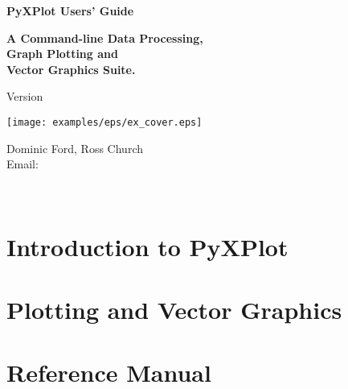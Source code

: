 \documentclass[a4paper,onecolumn,11pt]{book}
\begin{document}
\begin{titlepage}
\normalsize
\vspace*{0.5cm}
\begin{center}
{\Huge \bf PyXPlot Users' Guide}\\
\end{center}
\vspace*{0.5cm}
\begin{center}
{\LARGE \bf A Command-line Data Processing, \\ \vspace{2mm} Graph Plotting and \\ \vspace{2mm} Vector Graphics Suite. \\}
\end{center}
\vspace*{0.5cm}
\begin{center}
{\Large Version \version \\}
\end{center}
\vspace*{0.0cm}
\begin{center}
\texttt{[image: examples/eps/ex\_cover.eps]}
\end{center}
\vspace*{0.0cm}
\begin{center}
{\Large Dominic Ford, Ross Church \\ \vspace{2mm} Email:  \\ }
\end{center}
\vspace*{0.5cm}
\begin{center}
{\Large \reldate \\}
\end{center}
\end{titlepage}


\tableofcontents

\listoffigures
{}

\part{Introduction to PyXPlot}





\part{Plotting and Vector Graphics}


\part{Reference Manual}








\appendix





\printindex
\end{document}

